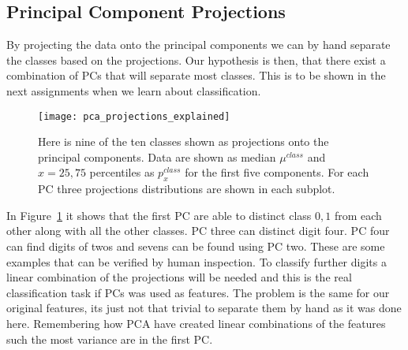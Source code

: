 \subsection{Principal Component Projections}
By projecting the data onto the principal components we can by hand separate the classes based on the projections. Our hypothesis is then, that there exist a combination of PCs that will separate most classes. This is to be shown in the next assignments when we learn about classification.
\begin{figure}[hbtp]
\centering
\texttt{[image: pca\_projections\_explained]}
\caption{Here is nine of the ten classes shown as projections onto the principal components. Data are shown as median $\mu^{class}$ and $x={25,75}$ percentiles as $p_{x}^{class}$ for the first five components. For each PC three projections distributions are shown in each subplot. \label{fig:pca_projections_explained}}
\end{figure}
In Figure~\ref{fig:pca_projections_explained} it shows that the first PC are able to distinct class ${0,1}$ from each other along with all the other classes. PC three can distinct digit four. PC four can find digits of twos and sevens can be found using PC two. These are some examples that can be verified by human inspection. To classify further digits a linear combination of the projections will be needed and this is the real classification task if PCs was used as features. The problem is the same for our original features, its just not that trivial to separate them by hand as it was done here. Remembering how PCA have created linear combinations of the features such the most variance are in the first PC. 
